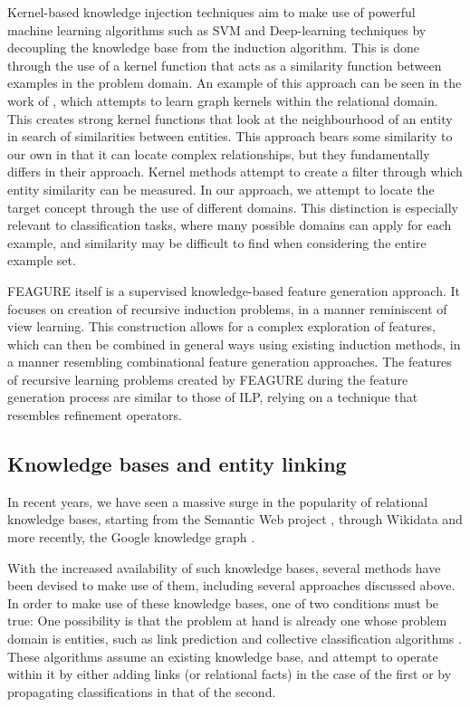 \documentclass[twoside,11pt]{article}
\theoremstyle{definition}
\begin{document}
Kernel-based knowledge injection techniques aim to make use of powerful machine learning algorithms such as SVM and Deep-learning techniques by decoupling the knowledge base from the induction algorithm. This is done through the use of a kernel function that acts as a similarity function between examples in the problem domain. An example of this approach can be seen in the work of , which attempts to learn graph kernels within the relational domain. This creates strong kernel functions that look at the neighbourhood of an entity in search of similarities between entities. This approach bears some similarity to our own in that it can locate complex relationships, but they fundamentally differs in their approach. Kernel methods attempt to create a filter through which entity similarity can be measured. In our approach, we attempt to locate the target concept through the use of different domains. This distinction is especially relevant to classification tasks, where many possible domains can apply for each example, and similarity may be difficult to find when considering the entire example set.

FEAGURE itself is a supervised knowledge-based feature generation approach. It focuses on creation of recursive induction problems, in a manner reminiscent of view learning. This construction allows for a complex exploration of features, which can then be combined in general ways using existing induction methods, in a manner resembling combinational feature generation approaches.
The features of recursive learning problems created by FEAGURE during the feature generation process are similar to those of ILP, relying on a technique that resembles refinement operators. 

\subsection{Knowledge bases and entity linking}

In recent years, we have seen a massive surge in the popularity of relational knowledge bases, starting from the Semantic Web project \cite{bizer2009linkedfull}, through Wikidata \cite{vrandevcic2014wikidata} and more recently, the Google knowledge graph \cite{pelikanova2014google}.

With the increased availability of such knowledge bases, several methods have been devised to make use of them, including several approaches discussed above.
In order to make use of these knowledge bases, one of two conditions must be true:
One possibility is that the problem at hand is already one whose problem domain is entities, such as link prediction \cite{popescul2003statistical2,getoor2005link} and collective classification algorithms \cite{raghavan2004exploration,kajdanowicz2013collectiveaa}. These algorithms assume an existing knowledge base, and attempt to operate within it by either adding links (or relational facts) in the case of the first or by propagating classifications in that of the second.
\end{document}
